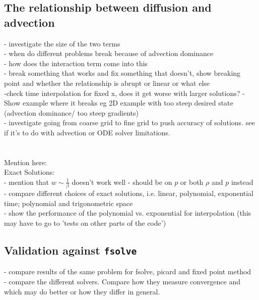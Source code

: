\documentclass[11pt, a4paper]{article}
\theoremstyle{definition}
\begin{document}
\subsection{The relationship between diffusion and advection}
- investigate the size of the two terms \\
- when do different problems break because of advection dominance\\
- how does the interaction term come into this\\
- break something that works and fix something that doesn't, show breaking point and whether the relationship is abrupt or linear or what else\\
-check time interpolation for fixed x, does it get worse with larger solutions?
- Show example where it breaks eg 2D example with too steep desired state (advection dominance/ too steep gradients)\\
- investigate going from coarse grid to fine grid to push accuracy of solutions. see if it's to do with advection or ODE solver limitations.\\
\\
\\
Mention here:\\
Exact Solutions:\\
- mention that $w \sim \frac{1}{\beta}$ doesn't work well - should be on $p$ or both $\rho$ and $p$ instead \\
- compare different choices of exact solutions, i.e. linear, polynomial, exponential time; polynomial and trigonometric space \\
- show the performance of the polynomial vs. exponential for interpolation (this may have to go to 'tests on other parts of the code') \\
\subsection{Validation against \texttt{fsolve}}
- compare results of the same problem for fsolve, picard and fixed point method\\
- compare the different solvers. Compare how they measure convergence and which may do better or how they differ in general.\\
\\
\\

\end{document}
